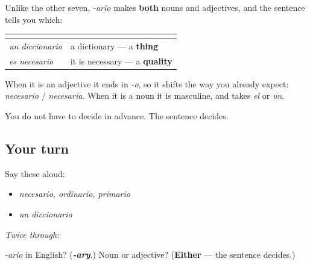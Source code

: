 \begin{grammarlens}[title={Grammar Lens: it does two jobs}]
Unlike the other seven, \emph{-ario} makes \textbf{both} nouns and adjectives, and the sentence tells you which:

\noindent
\begin{tabularx}{\linewidth}{@{}>{\raggedright\arraybackslash}X>{\raggedright\arraybackslash}X@{}}
\toprule
\textbf{} & \textbf{} \\
\midrule
\emph{un diccionario} & a dictionary — a \textbf{thing} \\
\emph{es necesario} & it is necessary — a \textbf{quality} \\
\bottomrule
\end{tabularx}

When it is an adjective it ends in \emph{-o}, so it shifts the way you already expect: \emph{necesario} / \emph{necesaria}. When it is a noun it is masculine, and takes \emph{el} or \emph{un}.

You do not have to decide in advance. The sentence decides.
\end{grammarlens}

\subsection*{Your turn}
Say these aloud:

\begin{itemize}
\raggedright
  \item \emph{necesario, ordinario, primario}
  \item \emph{un diccionario}
\end{itemize}

\emph{Twice through:}

\begin{tcolorbox}[breakable,colback=teal!4,colframe=teal!35!black,title={Before you move on}]
\emph{-ario} in English? (\emph{\textbf{-ary}}.) Noun or adjective? (\textbf{Either} — the sentence decides.)
\end{tcolorbox}
